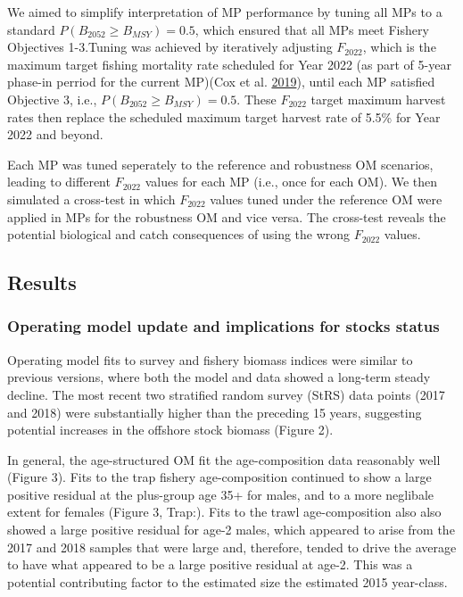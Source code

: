 \documentclass[11pt]{book}
\begin{document}
We aimed to simplify interpretation of MP performance by tuning all MPs to a standard \(P(B_{2052} \geq B_{MSY}) = 0.5\), which ensured that all MPs meet Fishery Objectives 1-3.Tuning was achieved by iteratively adjusting \(F_{2022}\), which is the maximum target fishing mortality rate scheduled for Year 2022 (as part of 5-year phase-in perriod for the current MP)(Cox et al. \protect\hyperlink{ref-cox2019evaluating}{2019}), until each MP satisfied Objective 3, i.e., \(P(B_{2052} \geq B_{MSY}) = 0.5\). These \(F_{2022}\) target maximum harvest rates then replace the scheduled maximum target harvest rate of 5.5\% for Year 2022 and beyond.

Each MP was tuned seperately to the reference and robustness OM scenarios, leading to different \(F_{2022}\) values for each MP (i.e., once for each OM). We then simulated a cross-test in which \(F_{2022}\) values tuned under the reference OM were applied in MPs for the robustness OM and vice versa. The cross-test reveals the potential biological and catch consequences of using the wrong \(F_{2022}\) values.

\hypertarget{results}{%
\subsection{Results}\label{results}}

\hypertarget{operating-model-update-and-implications-for-stocks-status}{%
\subsubsection{Operating model update and implications for stocks status}\label{operating-model-update-and-implications-for-stocks-status}}

Operating model fits to survey and fishery biomass indices were similar to previous versions, where both the model and data showed a long-term steady decline. The most recent two stratified random survey (StRS) data points (2017 and 2018) were substantially higher than the preceding 15 years, suggesting potential increases in the offshore stock biomass (Figure 2).

In general, the age-structured OM fit the age-composition data reasonably well (Figure 3). Fits to the trap fishery age-composition continued to show a large positive residual at the plus-group age 35+ for males, and to a more neglibale extent for females (Figure 3, Trap:). Fits to the trawl age-composition also also showed a large positive residual for age-2 males, which appeared to arise from the 2017 and 2018 samples that were large and, therefore, tended to drive the average to have what appeared to be a large positive residual at age-2. This was a potential contributing factor to the estimated size the estimated 2015 year-class.
\end{document}
